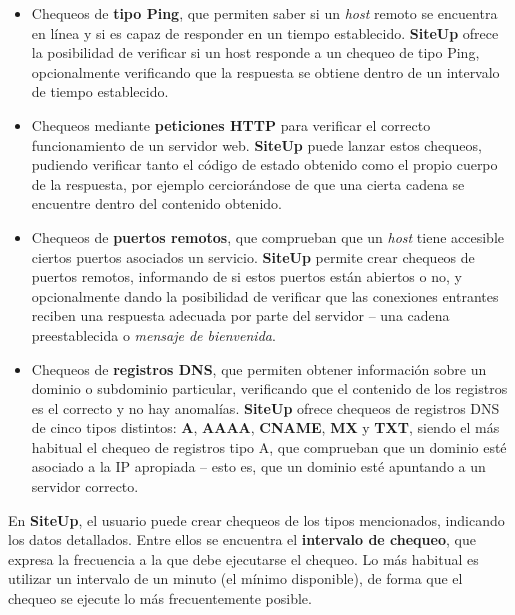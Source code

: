 \documentclass[a4paper,12pt]{article}
\begin{document}
\begin{itemize}

\item Chequeos de \textbf{tipo Ping}, que permiten saber si un \textit{host}
  remoto se encuentra en línea y si es capaz de responder en un tiempo
  establecido. \textbf{SiteUp} ofrece la posibilidad de verificar si un host
  responde a un chequeo de tipo Ping, opcionalmente verificando que la respuesta
  se obtiene dentro de un intervalo de tiempo establecido.

\item Chequeos mediante \textbf{peticiones HTTP} para verificar el correcto
  funcionamiento de un servidor web. \textbf{SiteUp} puede lanzar estos chequeos,
  pudiendo verificar tanto el código de estado obtenido como el propio cuerpo de
  la respuesta, por ejemplo cerciorándose de que una cierta cadena se encuentre
  dentro del contenido obtenido.

\item Chequeos de \textbf{puertos remotos}, que comprueban que un \textit{host}
  tiene accesible ciertos puertos asociados un servicio.  \textbf{SiteUp}
  permite crear chequeos de puertos remotos, informando de si estos puertos
  están abiertos o no, y opcionalmente dando la posibilidad de verificar que las
  conexiones entrantes reciben una respuesta adecuada por parte del servidor --
  una cadena preestablecida o \textit{mensaje de bienvenida}.

\item Chequeos de \textbf{registros DNS}, que permiten obtener información sobre
  un dominio o subdominio particular, verificando que el contenido de los
  registros es el correcto y no hay anomalías. \textbf{SiteUp} ofrece chequeos
  de registros DNS de cinco tipos distintos: \textbf{A}, \textbf{AAAA},
  \textbf{CNAME}, \textbf{MX} y \textbf{TXT}, siendo el más habitual el chequeo
  de registros tipo A, que comprueban que un dominio esté asociado a la IP
  apropiada -- esto es, que un dominio esté apuntando a un servidor correcto.

\end{itemize}



En \textbf{SiteUp}, el usuario puede crear chequeos de los tipos mencionados,
indicando los datos detallados. Entre ellos se encuentra el \textbf{intervalo de
  chequeo}, que expresa la frecuencia a la que debe ejecutarse el chequeo. Lo
más habitual es utilizar un intervalo de un minuto (el mínimo disponible), de
forma que el chequeo se ejecute lo más frecuentemente posible.
\end{document}
